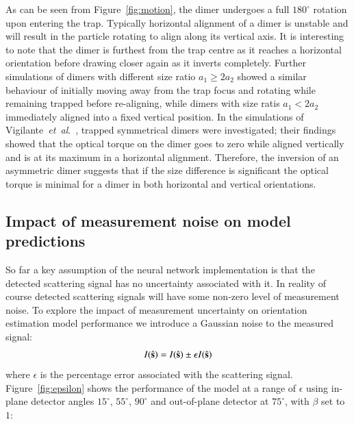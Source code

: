 \documentclass[final,  3p]{elsarticle}
\begin{document}
As can be seen from Figure~\ref{fig:motion}, the dimer undergoes a full $180^{\circ}$ rotation upon entering the trap.  Typically horizontal alignment of a dimer is unstable and will result in the particle rotating to align along its vertical axis.  It is interesting to note that the dimer is furthest from the trap centre as it reaches a horizontal orientation before drawing closer again as it inverts completely. Further simulations of dimers with different size ratio $a_1 \geq 2a_2$ showed a similar behaviour of initially moving away from the trap focus and rotating while remaining trapped before re-aligning, while dimers with size ratis $a_1 < 2a_2$ immediately aligned into a fixed vertical position.
%
In the simulations of Vigilante~\emph{et~al}.\ \cite{Vigilante2020Brownian_OT}, trapped symmetrical dimers were investigated; their findings showed that the optical torque on the dimer goes to zero while aligned vertically and is at its maximum in a horizontal alignment. Therefore, the inversion of an asymmetric dimer suggests that if the size difference is significant the optical torque is minimal for a dimer in both horizontal and vertical orientations.  
\subsection{Impact of measurement noise on model predictions}
\label{sec:epsilon}

So far a key assumption of the neural network implementation is that the detected scattering signal  has no uncertainty associated with it. In reality of course detected scattering signals  will have some non-zero level of measurement  noise. To explore the impact of measurement uncertainty on orientation estimation model performance we introduce a Gaussian noise to the measured signal:
\begin{align}
	I(\hat{\bf s}) = I(\hat{\bf s}) \pm \epsilon I(\hat{\bf s})
\end{align}
where $\epsilon$ is the percentage error associated with the scattering signal.  Figure~\ref{fig:epsilon} shows the performance of the model at a range of $\epsilon$ using in-plane detector angles $15^{\circ}$, $55^{\circ}$, $90^{\circ}$ and out-of-plane detector at $75^{\circ}$, with $\beta$ set to $1$:
\end{document}
